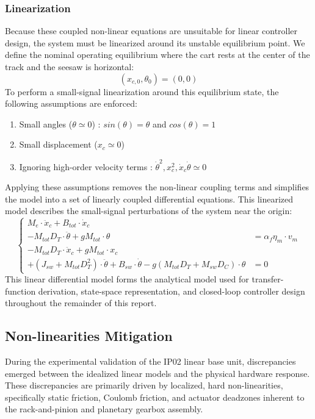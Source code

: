 \documentclass[11pt,a4paper]{article}
\begin{document}
\subsubsection{Linearization}\label{subsub:seesaw_linearization}
Because these coupled non-linear equations are unsuitable for linear controller design, the system must be linearized around its unstable equilibrium point. We define the nominal operating equilibrium where the cart rests at the center of the track and the seesaw is horizontal:
\begin{equation*}
    (x_{c,0}, \theta_0) = (0,0)
\end{equation*}
To perform a small-signal linearization around this equilibrium state, the following assumptions are enforced:
\begin{enumerate}
	\item Small angles ($\theta \simeq 0$) : $sin(\theta) = \theta$ and $cos(\theta) = 1$
	\item Small displacement ($x_c \simeq 0$)
	\item Ignoring high-order velocity terms : $\dot{\theta}^2, x_c^2, \dot{x}_c\dot{\theta} \simeq 0$
\end{enumerate}
Applying these assumptions removes the non-linear coupling terms and simplifies the model into a set of linearly coupled differential equations. This linearized model describes the small-signal perturbations of the system near the origin:
\begin{equation}\label{eq:lin_seesaw_eom}
	\left\{
	\begin{aligned}
		M_e \cdot \ddot{x}_c + B_{tot} \cdot \dot{x}_c \\
            - M_{tot} D_T \cdot \ddot{\theta} + g M_{tot} \cdot \theta  
            & =  \alpha_f \eta_m \cdot v_m\\
		- M_{tot} D_T \cdot \ddot{x}_c + g M_{tot} \cdot x_c \\
            + (J_{sw} + M_{tot} D^2_T) \cdot \ddot{\theta} + B_{sw} \cdot \dot{\theta} - g(M_{tot} D_T + M_{sw}D_C) \cdot \theta 
            &= 0
	\end{aligned}
	\right.
\end{equation}
This linear differential model forms the analytical model used for transfer-function derivation, state-space representation, and closed-loop controller design throughout the remainder of this report.

\subsection{Non-linearities Mitigation}\label{sub:deadzone_setup}
During the experimental validation of the IP02 linear base unit, discrepancies emerged between the idealized linear models and the physical hardware response. These discrepancies are primarily driven by localized, hard non-linearities, specifically static friction, Coulomb friction, and actuator deadzones inherent to the rack-and-pinion and planetary gearbox assembly.
\end{document}

